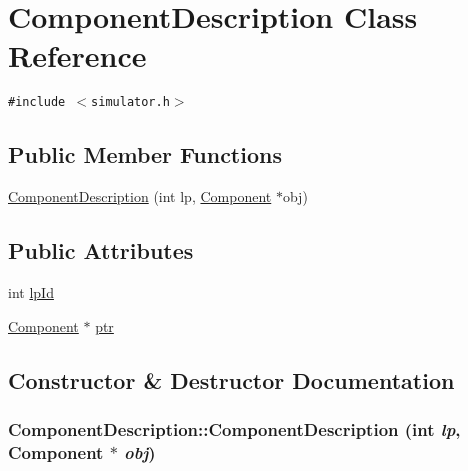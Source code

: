 \hypertarget{classComponentDescription}{
\section{ComponentDescription Class Reference}
\label{classComponentDescription}
}
{\tt \#include $<$simulator.h$>$}

\subsection*{Public Member Functions}
\begin{CompactItemize}
\item 
\hyperlink{classComponentDescription_ebcfce0c12f379fe3c7d19fc02a9751e}{ComponentDescription} (int lp, \hyperlink{classComponent}{Component} $\ast$obj)
\end{CompactItemize}
\subsection*{Public Attributes}
\begin{CompactItemize}
\item 
int \hyperlink{classComponentDescription_79464b7b6ee786c1396e33afa503292f}{lpId}
\item 
\hyperlink{classComponent}{Component} $\ast$ \hyperlink{classComponentDescription_784cd2019b9d92de3206075c48aefdea}{ptr}
\end{CompactItemize}


\subsection{Constructor \& Destructor Documentation}
\hypertarget{classComponentDescription_ebcfce0c12f379fe3c7d19fc02a9751e}{
\subsubsection[{ComponentDescription}]{\setlength{\rightskip}{0pt plus 5cm}ComponentDescription::ComponentDescription (int {\em lp}, \/  {\bf Component} $\ast$ {\em obj})}}
\label{classComponentDescription_ebcfce0c12f379fe3c7d19fc02a9751e}




